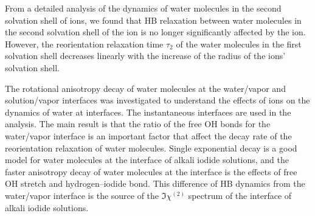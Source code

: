 
From a detailed analysis of the dynamics of water molecules in the second solvation shell of ions, 
we found that HB relaxation between water molecules in the second solvation shell of the ion is 
no longer significantly affected by the ion.
However, the reorientation relaxation time $\tau_2$ of the water molecules in the first solvation shell 
decreases linearly with the increase of the radius of the ions' solvation shell. 

The rotational anisotropy decay of water molecules at the water/vapor and solution/vapor interfaces was investigated to
understand the effects of ions on the dynamics of water at interfaces.
The instantaneous interfaces are used in the analysis. The main result is that the ratio of the free OH bonds for the water/vapor interface is an important factor 
that affect the decay rate of the reorientation relaxation of water molecules.
Single exponential decay is a good model for water molecules at the interface of alkali iodide solutions,
and the faster anisotropy decay of water molecules at the interface is the effects of free OH stretch and hydrogen--iodide bond.
This difference of HB dynamics from the water/vapor interface is the source of 
the $\Im\chi^{(2)}$ spectrum of the interface of alkali iodide solutions.  
